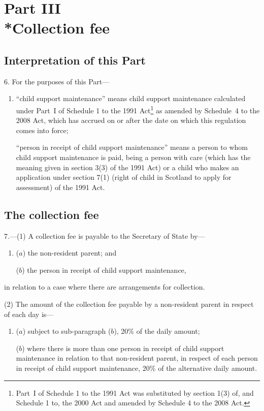 \documentclass[12pt,a4paper]{article}
\begin{document}
\section[Part III --- Collection fee]{Part III\\*Collection fee}

\renewcommand\parthead{--- Part III}

\subsection[6. Interpretation of this Part]{Interpretation of this Part}

6.  For the purposes of this Part—
\begin{enumerate}\item[]
“child support maintenance” means child support maintenance calculated under Part~I of Schedule 1 to the 1991 Act\footnote{Part~I of Schedule 1 to the 1991 Act was substituted by section 1(3) of, and Schedule 1 to, the 2000 Act and amended by Schedule 4 to the 2008 Act.} as amended by Schedule~4 to the 2008 Act, which has accrued on or after the date on which this regulation comes into force;

“person in receipt of child support maintenance” means a person to whom child support maintenance is paid, being a person with care (which has the meaning given in section 3(3) of the 1991 Act) or a child who makes an application under section 7(1) (right of child in Scotland to apply for assessment) of the 1991 Act.
\end{enumerate}

\subsection[7. The collection fee]{The collection fee}

7.—(1) A collection fee is payable to the Secretary of State by—
\begin{enumerate}\item[]
($a$) the non-resident parent; and

($b$) the person in receipt of child support maintenance,
\end{enumerate}
in relation to a case where there are arrangements for collection.

(2) The amount of the collection fee payable by a non-resident parent in respect of each day is—
\begin{enumerate}\item[]
($a$) subject to sub-paragraph ($b$), 20\% of the daily amount;

($b$) where there is more than one person in receipt of child support maintenance in relation to that non-resident parent, in respect of each person in receipt of child support maintenance, 20\% of the alternative daily amount.
\end{enumerate}
\end{document}
